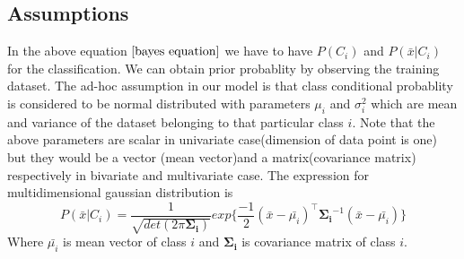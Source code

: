 \documentclass[a4paper]{article}
\begin{document}
\subsection{Assumptions}
In the above equation $\ref{bayes equation}$ we have to have $P(C_{i})$ and $P(\bar{x}|C_{i})$ for the classification. We can obtain prior probablity by observing the training dataset. The ad-hoc assumption in our model is that class conditional probablity is considered to be normal distributed with parameters $\mu_{i}$ and $\sigma_{i}^{2}$ which are mean and variance of the dataset belonging to that particular class $i$. Note that the above parameters are scalar in univariate case(dimension of data point is one) but they would be a vector (mean vector)and a matrix(covariance matrix) respectively in bivariate and multivariate case. The expression for multidimensional gaussian distribution is
\begin{equation}
P(\bar{x}|C_{i}) = \frac{1}{\sqrt{det(2\pi\mathbf{\Sigma_{i}})}}exp\{\frac{-1}{2}(\bar{x}-\bar{\mu_{i}})^{\intercal}\mathbf{\Sigma_{i}}^{-1}(\bar{x}-\bar{\mu_{i}})\}
\end{equation}Where $\bar{\mu_{i}}$ is mean vector of class $i$ and $\mathbf{\Sigma_{i}}$ is covariance matrix of class $i$.
\end{document}
